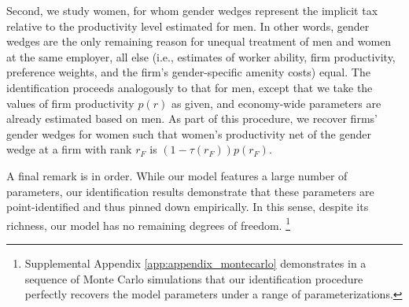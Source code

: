 Second, we study women, for whom gender wedges represent the implicit tax relative to the productivity level estimated for men. In other words, gender wedges are the only remaining reason for unequal treatment of men and women at the same employer, all else (i.e., estimates of worker ability, firm productivity, preference weights, and the firm's gender-specific amenity costs) equal. The identification proceeds analogously to that for men, except that we take the values of firm productivity $p(r)$ as given, and economy-wide parameters are already estimated based on men. As part of this procedure, we recover firms' gender wedges for women such that women's productivity net of the gender wedge at a firm with rank $r_{F}$ is $(1 - \tau(r_{F})) p(r_{F})$.

A final remark is in order. While our model features a large number of parameters, our identification results demonstrate that these parameters are point-identified and thus pinned down empirically. In this sense, despite its richness, our model has no remaining degrees of freedom.%
%
\footnote{Supplemental Appendix \ref{app:appendix_montecarlo} demonstrates in a sequence of Monte Carlo simulations that our identification procedure perfectly recovers the model parameters under a range of parameterizations.} %
%